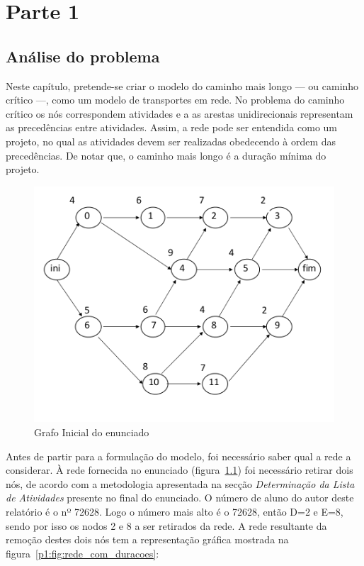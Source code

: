 \chapter{Parte 1}
\label{cap:p1}

\section{Análise do problema}



Neste capítulo, pretende-se criar o modelo do caminho mais longo --- ou caminho
crítico ---, como um modelo de transportes em rede. No problema do caminho
crítico os nós correspondem atividades e a as arestas unidirecionais representam
as precedências entre atividades. Assim, a rede pode ser entendida como um
projeto, no qual as atividades devem ser realizadas obedecendo à ordem das
precedências. De notar que, o caminho mais longo é a duração mínima do projeto.


\begin{figure}[<+htpb+>]
	\centering
	\includegraphics[scale=0.5]{./img/p1_rede_original}
	\caption{Grafo Inicial do enunciado}
\label{p1:fig:rede_original}
\end{figure}

Antes de partir para a formulação do modelo, foi necessário saber qual a rede
a considerar. À rede fornecida no enunciado (figura~\ref{p1:fig:rede_original})
foi necessário retirar dois nós, de acordo com a metodologia apresentada na
secção \textit{Determinação da Lista de Atividades} presente no final do
enunciado. O número de aluno do autor deste relatório é o nº 72628. Logo
o número mais alto é o 72628, então D=2 e E=8, sendo por isso os nodos
2 e 8 a ser retirados da rede. A rede resultante da remoção destes dois nós tem
a representação gráfica mostrada na figura~\ref{p1:fig:rede_com_duracoes}:

